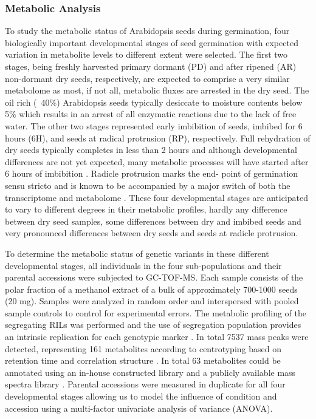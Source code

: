 \subsubsection{Metabolic Analysis}
To study the metabolic status of Arabidopsis seeds during germination, four biologically important developmental stages 
of seed germination with expected variation in metabolite levels to different extent were selected. The first two stages, 
being freshly harvested primary dormant (PD) and after ripened (AR) non-dormant dry seeds, respectively, are expected to 
comprise a very similar metabolome as most, if not all, metabolic fluxes are arrested in the dry seed. The oil rich 
(~40\%) Arabidopsis seeds \cite{Hobbs:2004} typically desiccate to moisture contents below 5\% which results in an 
arrest of all enzymatic reactions due to the lack of free water. The other two stages represented early imbibition of 
seeds, imbibed for 6 hours (6H), and seeds at radical protrusion (RP), respectively. Full rehydration of dry seeds typically 
completes in less than 2 hours and although developmental differences are not yet expected, many metabolic processes will 
have started after 6 hours of imbibition \cite{Nakabayashi:2005, Howell:2009}. Radicle protrusion marks the end-
point of germination sensu stricto and is known to be accompanied by a major switch of both the transcriptome and metabolome 
\cite{Nakabayashi:2005, Fait:2006}. These four developmental stages are anticipated to vary to different degrees 
in their metabolic profiles, hardly any difference between dry seed samples, some differences between dry and imbibed seeds 
and very pronounced differences between dry seeds and seeds at radicle protrusion.

To determine the metabolic status of genetic variants in these different developmental stages, all individuals in the 
four sub-populations and their parental accessions were subjected to GC-TOF-MS. Each sample consists of the polar fraction 
of a methanol extract of a bulk of approximately 700-1000 seeds (20 mg). Samples were analyzed in random order and 
interspersed with pooled sample controls to control for experimental errors. The metabolic profiling of the segregating RILs 
was performed and the use of segregation population provides an intrinsic replication for each genotypic marker \cite{Jansen:2001a}.
In total 7537 mass peaks were detected, representing 161 metabolites according to centrotyping based on retention time and 
correlation structure \cite{Tikunov:2012}. In total 63 metabolites could be annotated using an in-house constructed library 
and a publicly available mass spectra library \cite{Schauer:2005}. Parental accessions were measured in duplicate for all 
four developmental stages allowing us to model the influence of condition and accession using a multi-factor univariate 
analysis of variance (ANOVA). 

